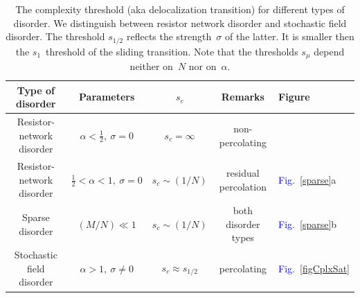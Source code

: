 \documentclass[aps,pre,floats,floatfix,twocolumn]{revtex4}
\newcommand{\Fig}[1]{\textcolor{blue}{Fig.}\!\!~\ref{#1}}
\begin{document}
\begin{table}

\begin{tabular}{|c|c|c|c|l|}
\hline 
Type of disorder & Parameters &  $s_c$ & Remarks & Figure \\ 
\hline
Resistor-network disorder & $\alpha{<}\frac{1}{2}, \ \sigma{=}0$    &  $s_c = \infty$ &  non-percolating & \\
Resistor-network disorder & $\frac{1}{2}{<}\alpha{<}1, \ \sigma{=}0$   &  $s_c \sim (1/N)$ & residual percolation & \Fig{sparse}a \\
Sparse disorder & $(M/N) \ll 1$ &  $s_c \sim (1/N)$  &  both disorder types  & \Fig{sparse}b \\
Stochastic field disorder & $\alpha{>}1, \ \sigma{\ne}0$ & $s_c \approx s_{1/2}$ & percolating & \Fig{figCplxSat} \\
\hline
\end{tabular}

\caption{\label{tbl}
The complexity threshold (aka delocalization transition) for different types of disorder.
We distinguish between resistor network disorder and stochastic field disorder.  
The threshold $s_{1/2}$ reflects the strength~$\sigma$ of the latter. 
It is smaller then the $s_1$~threshold of the sliding transition.    
Note that the thresholds $s_{\mu}$ depend neither on~$N$ nor on~$\alpha$. 
} 

\end{table}
\end{document}
